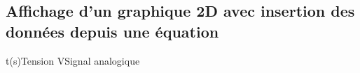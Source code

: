\newpage

\subsection{Affichage d'un graphique 2D avec insertion des données depuis une équation}



\begin{graphics}{0.4}{0.4}{0}{3}{-1}{5}{t(s)}{Tension V}{Signal analogique}
\end{graphics}













